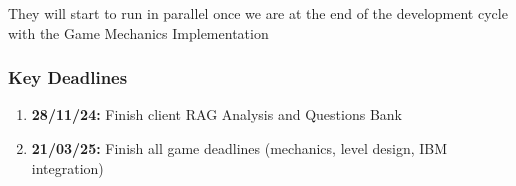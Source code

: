 \documentclass[11pt, a4paper]{article}
\begin{document}
\noindent They will start to run in parallel once we are at the end of the development cycle with the Game Mechanics Implementation

\subsubsection{Key Deadlines}

\begin{enumerate}
    \item \textbf{28/11/24:} Finish client RAG Analysis and Questions Bank
    \item \textbf{21/03/25:} Finish all game deadlines (mechanics, level design, IBM integration)
\end{enumerate}
\end{document}
